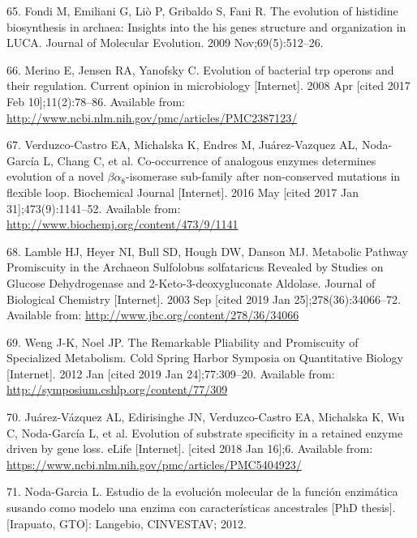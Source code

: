\documentclass[12pt,twoside]{reedthesis}
\begin{document}
  \hypertarget{ref-fondi_evolution_2009}{}
  65. Fondi M, Emiliani G, Liò P, Gribaldo S, Fani R. The evolution of
  histidine biosynthesis in archaea: Insights into the his genes structure
  and organization in LUCA. Journal of Molecular Evolution. 2009
  Nov;69(5):512--26.
  
  \hypertarget{ref-merino_evolution_2008}{}
  66. Merino E, Jensen RA, Yanofsky C. Evolution of bacterial trp operons
  and their regulation. Current opinion in microbiology {[}Internet{]}.
  2008 Apr {[}cited 2017 Feb 10{]};11(2):78--86. Available from:
  \url{http://www.ncbi.nlm.nih.gov/pmc/articles/PMC2387123/}
  
  \hypertarget{ref-verduzco-castro_co-occurrence_2016}{}
  67. Verduzco-Castro EA, Michalska K, Endres M, Juárez-Vazquez AL,
  Noda-García L, Chang C, et al. Co-occurrence of analogous enzymes
  determines evolution of a novel \(\beta\alpha_8\)-isomerase sub-family
  after non-conserved mutations in flexible loop. Biochemical Journal
  {[}Internet{]}. 2016 May {[}cited 2017 Jan 31{]};473(9):1141--52.
  Available from: \url{http://www.biochemj.org/content/473/9/1141}
  
  \hypertarget{ref-lamble_archaea_promiscuou_pathways_2003}{}
  68. Lamble HJ, Heyer NI, Bull SD, Hough DW, Danson MJ. Metabolic Pathway
  Promiscuity in the Archaeon Sulfolobus solfataricus Revealed by Studies
  on Glucose Dehydrogenase and 2-Keto-3-deoxygluconate Aldolase. Journal
  of Biological Chemistry {[}Internet{]}. 2003 Sep {[}cited 2019 Jan
  25{]};278(36):34066--72. Available from:
  \url{http://www.jbc.org/content/278/36/34066}
  
  \hypertarget{ref-weng_promiscuity_specialized_pathways_2012}{}
  69. Weng J-K, Noel JP. The Remarkable Pliability and Promiscuity of
  Specialized Metabolism. Cold Spring Harbor Symposia on Quantitative
  Biology {[}Internet{]}. 2012 Jan {[}cited 2019 Jan 24{]};77:309--20.
  Available from: \url{http://symposium.cshlp.org/content/77/309}
  
  \hypertarget{ref-juarez-vazquez_evolution_2017}{}
  70. Juárez-Vázquez AL, Edirisinghe JN, Verduzco-Castro EA, Michalska K,
  Wu C, Noda-García L, et al. Evolution of substrate specificity in a
  retained enzyme driven by gene loss. eLife {[}Internet{]}. {[}cited 2018
  Jan 16{]};6. Available from:
  \url{https://www.ncbi.nlm.nih.gov/pmc/articles/PMC5404923/}
  
  \hypertarget{ref-noda_tesis_2012}{}
  71. Noda-Garcia L. Estudio de la evolución molecular de la función
  enzimática susando como modelo una enzima con características
  ancestrales {[}PhD thesis{]}. {[}Irapuato, GTO{]}: Langebio, CINVESTAV;
  2012.
  
\end{document}
